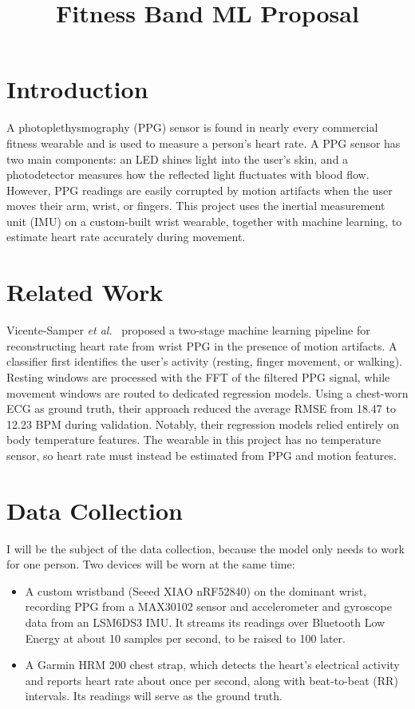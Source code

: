 \documentclass[conference]{IEEEtran}
\begin{document}
\title{Fitness Band ML Proposal}

\author{
}

\maketitle


\section{Introduction}
A photoplethysmography (PPG) sensor is found in nearly every commercial fitness wearable and is used to measure a person's heart rate. A PPG sensor has two main components: an LED shines light into the user's skin, and a photodetector measures how the reflected light fluctuates with blood flow. However, PPG readings are easily corrupted by motion artifacts when the user moves their arm, wrist, or fingers. This project uses the inertial measurement unit (IMU) on a custom-built wrist wearable, together with machine learning, to estimate heart rate accurately during movement.

\section{Related Work}
Vicente-Samper \textit{et al.}~\cite{vicente2023} proposed a two-stage machine learning pipeline for reconstructing heart rate from wrist PPG in the presence of motion artifacts. A classifier first identifies the user's activity (resting, finger movement, or walking). Resting windows are processed with the FFT of the filtered PPG signal, while movement windows are routed to dedicated regression models. Using a chest-worn ECG as ground truth, their approach reduced the average RMSE from 18.47 to 12.23 BPM during validation. Notably, their regression models relied entirely on body temperature features. The wearable in this project has no temperature sensor, so heart rate must instead be estimated from PPG and motion features.

\section{Data Collection}
I will be the subject of the data collection, because the model only needs to work for one person. Two devices will be worn at the same time:
\begin{itemize}
    \item A custom wristband (Seeed XIAO nRF52840) on the dominant wrist, recording PPG from a MAX30102 sensor and accelerometer and gyroscope data from an LSM6DS3 IMU. It streams its readings over Bluetooth Low Energy at about 10 samples per second, to be raised to 100 later.
    \item A Garmin HRM 200 chest strap, which detects the heart's electrical activity and reports heart rate about once per second, along with beat-to-beat (RR) intervals. Its readings will serve as the ground truth.
\end{itemize}
\end{document}

